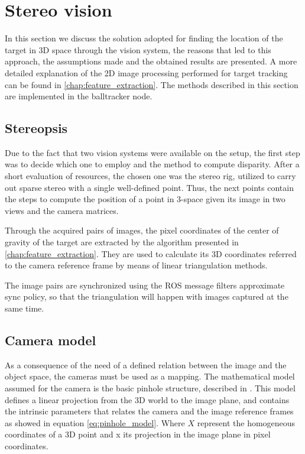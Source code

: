 
\chapter{Stereo vision} %
\label{chap:stereopsis}

In this section we discuss the solution adopted for finding the location of the target in 3D space through the vision system, the reasons that led to this approach, the assumptions made and the obtained results are presented.
A more detailed explanation of the 2D image processing performed for target tracking can be found in \ref{chap:feature_extraction}.
The methods described in this section are implemented in the balltracker node.

\section{Stereopsis}
Due to the fact that two vision systems were available on the setup, the first step was to decide which one to employ and the method to compute disparity.
After a short evaluation of resources, the chosen one was the stereo rig, utilized to carry out sparse stereo with a single well-defined point.
Thus, the next points contain the steps to compute the position of a point in 3-space given its image in two views and the camera matrices.

Through the acquired pairs of images, the pixel coordinates of the center of gravity of the target are extracted by the algorithm presented in \ref{chap:feature_extraction}.
They are used to calculate its 3D coordinates referred to the camera reference frame by means of linear triangulation methods.

The image pairs are synchronized using the ROS message filters approximate sync policy, so that the triangulation will happen with images captured at the same time.

\section{Camera model}
As a consequence of the need of a defined relation between the image and the object space, the cameras must be used as a mapping.
The mathematical model assumed for the camera is the basic pinhole structure, described in \cite{Hartley}.
This model defines a linear projection from the 3D world to the image plane, and contains the intrinsic parameters that relates the camera and the image reference frames as showed in equation \eqref{eq:pinhole_model}. Where $X$ represent the homogeneous coordinates of a 3D point and x its projection in the image plane in pixel coordinates.

